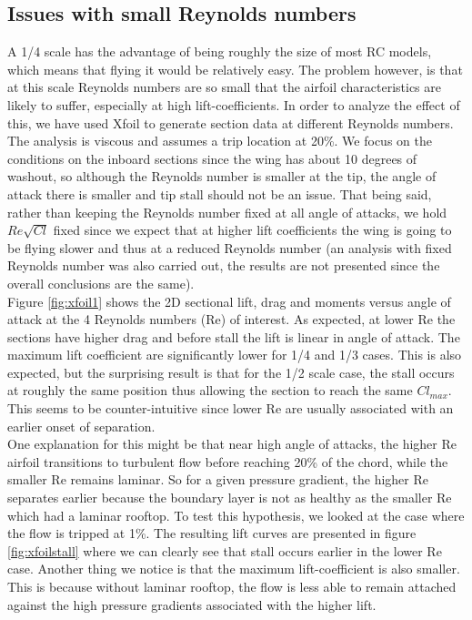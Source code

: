 \documentclass[titlepage,10pt]{article}
\begin{document}
\subsection{Issues with small Reynolds numbers}
A 1/4 scale has the advantage of being roughly the size of most RC models, which means that flying it would be relatively easy. The problem however, is that at this scale Reynolds numbers are so small that the airfoil characteristics are likely to suffer, especially at high lift-coefficients. In order to analyze the effect of this, we have used Xfoil to generate section data at different Reynolds numbers. The analysis is viscous and assumes a trip location at 20\%. We focus on the conditions on the inboard sections since the wing has about 10 degrees of washout, so although the Reynolds number is smaller at the tip, the angle of attack there is smaller and tip stall should not be an issue. That being said, rather than keeping the Reynolds number fixed at all angle of attacks, we hold $Re\sqrt{Cl}$ fixed since we expect that at higher lift coefficients the wing is going to be flying slower and thus at a reduced Reynolds number (an analysis with fixed Reynolds number was also carried out, the results are not presented since the overall conclusions are the same).\\

Figure \ref{fig:xfoil1} shows the 2D sectional lift, drag and moments versus angle of attack at the 4 Reynolds numbers (Re) of interest. As expected, at lower Re the sections have higher drag and before stall the lift is linear in angle of attack. The maximum lift coefficient are significantly lower for 1/4 and 1/3 cases. This is also expected, but the surprising result is that for the 1/2 scale case, the stall occurs at roughly the same position thus allowing the section to reach the same $Cl_{max}$. This seems to be counter-intuitive since lower Re are usually associated with an earlier onset of separation.\\

One explanation for this might be that near high angle of attacks, the higher Re airfoil transitions to turbulent flow before reaching 20\% of the chord, while the smaller Re remains laminar. So for a given pressure gradient, the higher Re separates earlier because the boundary layer is not as healthy as the smaller Re which had a laminar rooftop. To test this hypothesis, we looked at the case where the flow is tripped at 1\%. The resulting lift curves are presented in figure \ref{fig:xfoilstall} where we can clearly see that stall occurs earlier in the lower Re case. Another thing we notice is that the maximum lift-coefficient is also smaller. This is because without laminar rooftop, the flow is less able to remain attached against the high pressure gradients associated with the higher lift.\\
\end{document}

